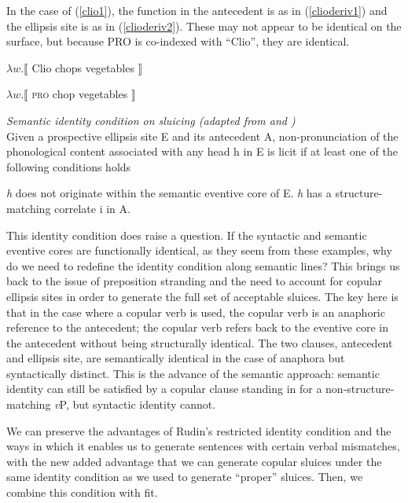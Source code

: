 \documentclass{turabian-researchpaper}
\begin{document}
In the case of (\ref{clio1}), the function in the antecedent is as in (\ref{clioderiv1}) and the ellipsis site is as in (\ref{clioderiv2}). These may not appear to be identical on the surface, but because PRO is co-indexed with ``Clio'', they are identical. 

\begin{exe}
\ex\label{clioderiv1} $\lambda w.\llbracket$ Clio chops vegetables $\rrbracket$
\end{exe}

\begin{exe}
\ex\label{clioderiv2} $\lambda w.\llbracket$ \textsc{pro} chop vegetables $\rrbracket$
\end{exe}

\begin{exe}
\ex\label{idcondonsluicing1} \textit{Semantic identity condition on sluicing (adapted from \citealt{rudin} and \citealp*{hardtrudin})}\\
Given a prospective ellipsis site E and its antecedent A, non-pronunciation of the phonological content associated with any head h in E is licit if at least one of the following conditions holds
\begin{xlist}
\ex \textit{h} does not originate within the semantic eventive core of E.
\ex \textit{h} has a structure-matching correlate i in A.
\end{xlist}
\end{exe}
This identity condition does raise a question. If the syntactic and semantic eventive cores are functionally identical, as they seem from these examples, why do we need to redefine the identity condition along semantic lines? This brings us back to the issue of preposition stranding and the need to account for copular ellipsis sites in order to generate the full set of acceptable sluices. The key here is that in the case where a copular verb is used, the copular verb is an anaphoric reference to the antecedent; the copular verb refers back to the eventive core in the antecedent without being structurally identical. The two clauses, antecedent and ellipsis site, are semantically identical in the case of anaphora but syntactically distinct. This is the advance of the semantic approach: semantic identity can still be satisfied by a copular clause standing in for a non-structure-matching \textit{v}P, but syntactic identity cannot. 

We can preserve the advantages of Rudin's restricted identity condition and the ways in which it enables us to generate sentences with certain verbal mismatches, with the new added advantage that we can generate copular sluices under the same identity condition as we used to generate ``proper'' sluices. Then, we combine this condition with fit. 
\end{document}
